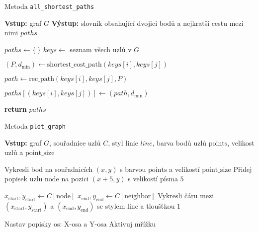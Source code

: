 \begin{algorithm}
    \caption{Metoda \texttt{all\_shortest\_paths}}
    \begin{algorithmic}[1]
        \STATE \textbf{Vstup:} graf $G$
        \STATE \textbf{Výstup:} slovník obsahující dvojici bodů a nejkratší cestu mezi nimi $paths$
        
        \STATE $paths \gets \{~\}$
        \STATE $keys \gets$ seznam všech uzlů v $G$
        
                \STATE $(P, d_\text{min}) \gets \text{shortest\_cost\_path}(keys[i], keys[j])$
                
                \STATE $path \gets \text{rec\_path}(keys[i], keys[j], P)$
                
                \STATE $paths[(keys[i], keys[j])] \gets (path, d_\text{min})$
            \ENDFOR
        \ENDFOR
        
        \STATE \textbf{return} $paths$ 
    \end{algorithmic}
\end{algorithm}

\begin{algorithm}
    \caption{Metoda \texttt{plot\_graph}}
    \begin{algorithmic}[1]
        \STATE \textbf{Vstup:} graf $G$, souřadnice uzlů $C$, styl linie $line$, barva bodů uzlů $\text{points}$, velikost uzlů a $\text{point\_size}$
        
            \STATE Vykresli bod na souřadnicích $(x, y)$ s barvou $\text{points}$ a velikostí $\text{point\_size}$
            \STATE Přidej popisek uzlu $\text{node}$ na pozici $(x + 5, y)$ s velikostí písma $5$
        \ENDFOR
        
            \STATE $x_\text{start}, y_\text{start} \gets C[\text{node}]$ 
                \STATE $x_\text{end}, y_\text{end} \gets C[\text{neighbor}]$ 
                \STATE Vykresli čáru mezi $(x_\text{start}, y_\text{start})$ a $(x_\text{end}, y_\text{end})$ se stylem $\text{line}$ a tloušťkou $1$
            \ENDFOR
        \ENDFOR
        

        \STATE Nastav popisky os: X-osa a Y-osa
        \STATE Aktivuj mřížku
    \end{algorithmic}
\end{algorithm}

